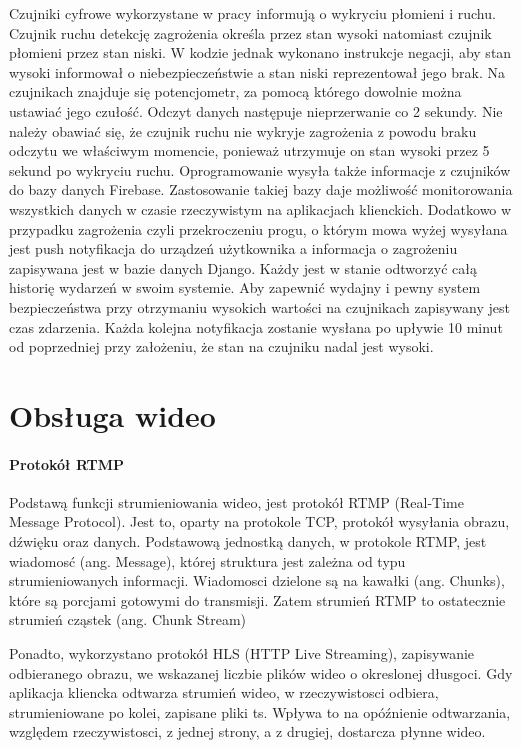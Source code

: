 Czujniki cyfrowe wykorzystane w pracy informują o wykryciu płomieni i ruchu. Czujnik ruchu detekcję zagrożenia określa przez stan wysoki natomiast czujnik płomieni przez stan niski. W kodzie jednak wykonano instrukcje negacji, aby stan wysoki informował o niebezpieczeństwie a stan niski reprezentował jego brak. Na czujnikach znajduje się potencjometr, za pomocą którego dowolnie można ustawiać jego czułość. Odczyt danych następuje nieprzerwanie co 2 sekundy. Nie należy obawiać się, że czujnik ruchu nie wykryje zagrożenia z powodu braku odczytu we właściwym momencie, ponieważ utrzymuje on stan wysoki przez 5 sekund po wykryciu ruchu. Oprogramowanie wysyła także informacje z czujników do bazy danych Firebase. Zastosowanie takiej bazy daje możliwość monitorowania wszystkich danych w czasie rzeczywistym na aplikacjach klienckich. Dodatkowo w przypadku zagrożenia czyli przekroczeniu progu, o którym mowa wyżej wysyłana jest push notyfikacja do urządzeń użytkownika a informacja o zagrożeniu zapisywana jest w bazie danych Django. Każdy jest w stanie odtworzyć całą historię wydarzeń w swoim systemie.
Aby zapewnić wydajny i pewny system bezpieczeństwa przy otrzymaniu wysokich wartości na czujnikach zapisywany jest czas zdarzenia. Każda kolejna notyfikacja zostanie wysłana po upływie 10 minut od poprzedniej przy założeniu, że stan na czujniku nadal jest wysoki. 

\section{Obsługa wideo}

\paragraph{Protokół RTMP}
Podstawą funkcji strumieniowania wideo, jest protokół RTMP (Real-Time Message Protocol). Jest to, oparty na protokole TCP, protokół wysyłania obrazu, dźwięku oraz danych. 
Podstawową jednostką danych, w protokole RTMP, jest wiadomosć (ang. Message), której struktura jest zależna od typu strumieniowanych informacji. 
Wiadomosci dzielone są na kawałki (ang. Chunks), które są porcjami gotowymi do transmisji. Zatem strumień RTMP to ostatecznie strumień cząstek (ang. Chunk Stream)

Ponadto, wykorzystano protokół HLS (HTTP Live Streaming), zapisywanie odbieranego obrazu, we wskazanej liczbie plików wideo o okreslonej dłusgoci. Gdy aplikacja kliencka odtwarza strumień wideo, w rzeczywistosci odbiera, strumieniowane po kolei, zapisane pliki ts. Wpływa to na opóźnienie odtwarzania, względem rzeczywistosci, z jednej strony, a z drugiej, dostarcza płynne wideo.

